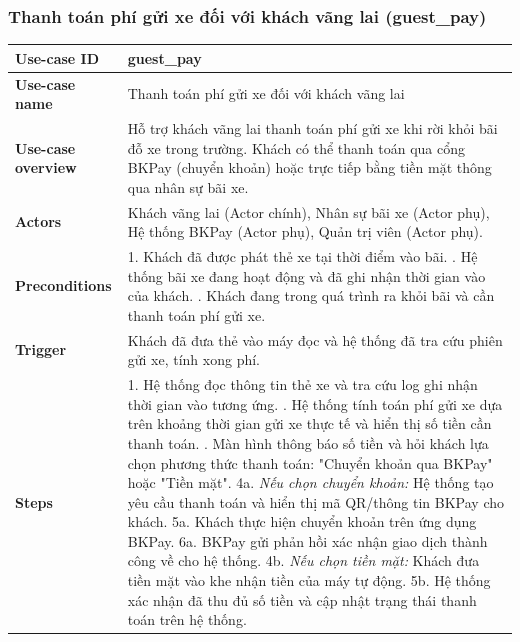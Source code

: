 \subsubsection{Thanh toán phí gửi xe đối với khách vãng lai (guest\_pay)}
\begingroup
\small
\begin{longtable}{|>{\centering\arraybackslash}m{3cm}|m{13.7cm}|}
\hline
\textbf{Use-case ID} & guest\_pay \\ \hline
\textbf{Use-case name} & Thanh toán phí gửi xe đối với khách vãng lai \\ \hline
\textbf{Use-case overview} & Hỗ trợ khách vãng lai thanh toán phí gửi xe khi rời khỏi bãi đỗ xe trong trường. Khách có thể thanh toán qua cổng BKPay (chuyển khoản) hoặc trực tiếp bằng tiền mặt thông qua nhân sự bãi xe. \\ \hline
\textbf{Actors} & Khách vãng lai (Actor chính), Nhân sự bãi xe (Actor phụ), Hệ thống BKPay (Actor phụ), Quản trị viên (Actor phụ). \\ \hline
\textbf{Preconditions} &
1. Khách đã được phát thẻ xe tại thời điểm vào bãi. \newline
2. Hệ thống bãi xe đang hoạt động và đã ghi nhận thời gian vào của khách. \newline
3. Khách đang trong quá trình ra khỏi bãi và cần thanh toán phí gửi xe. \\ \hline
\textbf{Trigger} & Khách đã đưa thẻ vào máy đọc và hệ thống đã tra cứu phiên gửi xe, tính xong phí. \\ \hline
\textbf{Steps} &
1. Hệ thống đọc thông tin thẻ xe và tra cứu log ghi nhận thời gian vào tương ứng. \newline
2. Hệ thống tính toán phí gửi xe dựa trên khoảng thời gian gửi xe thực tế và hiển thị số tiền cần thanh toán. \newline
3. Màn hình thông báo số tiền và hỏi khách lựa chọn phương thức thanh toán: "Chuyển khoản qua BKPay" hoặc "Tiền mặt". \newline
4a. \textit{Nếu chọn chuyển khoản:} Hệ thống tạo yêu cầu thanh toán và hiển thị mã QR/thông tin BKPay cho khách. \newline
5a. Khách thực hiện chuyển khoản trên ứng dụng BKPay. \newline
6a. BKPay gửi phản hồi xác nhận giao dịch thành công về cho hệ thống. \newline
4b. \textit{Nếu chọn tiền mặt:} Khách đưa tiền mặt vào khe nhận tiền của máy tự động. \newline
5b. Hệ thống xác nhận đã thu đủ số tiền và cập nhật trạng thái thanh toán trên hệ thống. \newline

\end{longtable}
